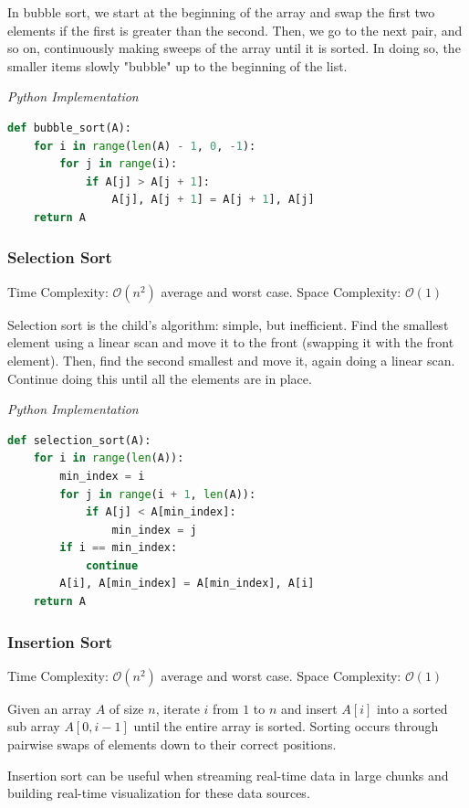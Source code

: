 \documentclass{article}
\newcommand{\bigO}{\mathcal{O}}
\begin{document}
    In bubble sort, we start at the beginning of the array and swap the first two elements if the first is greater than the second. Then, we go to the next pair, and so on, continuously making sweeps of the array until it is
    sorted. In doing so, the smaller items slowly "bubble" up to the beginning of the list. 

\vspace{8pt} \emph{Python Implementation}
\begin{lstlisting}[language=Python]
def bubble_sort(A):
    for i in range(len(A) - 1, 0, -1):
        for j in range(i):
            if A[j] > A[j + 1]:
                A[j], A[j + 1] = A[j + 1], A[j]
    return A
\end{lstlisting}
    \subsubsection{Selection Sort}
    Time Complexity: $\bigO(n^2)$ average and worst case. Space Complexity: $\bigO (1)$
    
    Selection sort is the child's algorithm: simple, but inefficient. Find the smallest element using a linear scan and move it to the front (swapping it with the front element). Then, find the second smallest and move it, again doing a linear scan. Continue doing this until all the elements are in place. 

\vspace{8pt} \emph{Python Implementation}
\begin{lstlisting}[language=Python]
def selection_sort(A):
    for i in range(len(A)):
        min_index = i
        for j in range(i + 1, len(A)):
            if A[j] < A[min_index]:
                min_index = j
        if i == min_index:
            continue
        A[i], A[min_index] = A[min_index], A[i]
    return A
\end{lstlisting}
    
    \subsubsection{Insertion Sort}
    Time Complexity: $\bigO(n^2)$ average and worst case. Space Complexity: $\bigO(1)$
    
    Given an array $A$ of size $n$, iterate $i$ from $1$ to $n$ and insert $A[i]$ into a sorted sub array $A[0, i-1]$ until the entire array is sorted. Sorting occurs through pairwise swaps of elements down to their correct positions.
    
    Insertion sort can be useful when streaming real-time data in large chunks and building real-time visualization for these data sources.
\end{document}
